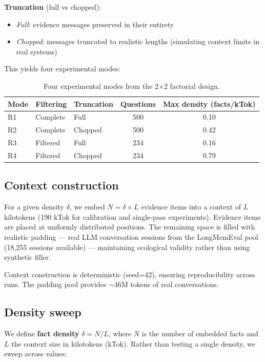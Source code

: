 \textbf{Truncation} (full vs chopped):
\begin{itemize}
  \item \textit{Full}: evidence messages preserved in their entirety
  \item \textit{Chopped}: messages truncated to realistic lengths (simulating context limits
    in real systems)
\end{itemize}

This yields four experimental modes:

\begin{table}[h]
\centering
\caption{Four experimental modes from the 2$\times$2 factorial design.}
\label{tab:modes}
\begin{tabular}{lllcc}
\toprule
Mode & Filtering & Truncation & Questions & Max density (facts/kTok) \\
\midrule
R1 & Complete & Full    & 500 & 0.10 \\
R2 & Complete & Chopped & 500 & 0.42 \\
R3 & Filtered & Full    & 234 & 0.16 \\
R4 & Filtered & Chopped & 234 & 0.79 \\
\bottomrule
\end{tabular}
\end{table}

\subsection{Context construction}
\label{sec:context-construction}

For a given density $\delta$, we embed $N = \delta \times L$ evidence items into a context of
$L$ kilotokens (190 kTok for calibration and single-pass experiments). Evidence
items are placed at uniformly distributed positions. The remaining space is
filled with realistic padding --- real LLM conversation sessions from the
LongMemEval pool (18{,}255 sessions available) --- maintaining ecological
validity rather than using synthetic filler.

Context construction is deterministic (seed=42), ensuring reproducibility
across runs. The padding pool provides $\sim$46M tokens of real conversations.

\subsection{Density sweep}
\label{sec:density-sweep}

We define \textbf{fact density} $\delta = N/L$, where $N$ is the number of embedded facts
and $L$ the context size in kilotokens (kTok). Rather than testing a single
density, we sweep across values:

